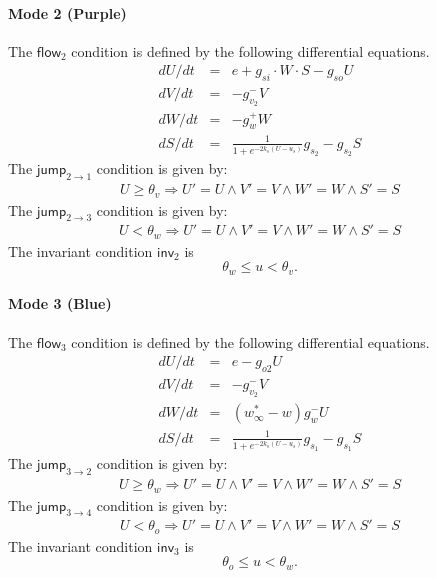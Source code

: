 \documentclass[envcountsect]{llncs}
\newcommand{\flow}{\mathsf{flow}}
\newcommand{\jump}{\mathsf{jump}}
\newcommand{\inv}{\mathsf{inv}}
\begin{document}
\paragraph{Mode 2 (Purple)}
The $\flow_2$ condition is defined by the following differential equations.
\begin{eqnarray*}
dU/dt &=& e  + g_{si}\cdot W\cdot S -g_{so}U\\
dV/dt &=& -g_{v_2}^- V\\
dW/dt &=& -g_w^+ W\\
dS/dt &=& \frac{1}{1+e^{-2k_s(U-u_s)}}g_{s_2} - g_{s_2}S
\end{eqnarray*}
The $\jump_{2\rightarrow 1}$ condition is given by:
\begin{eqnarray*}
U \geq \theta_v \Longrightarrow U' = U \wedge V' = V \wedge W' = W \wedge S'
= S
\end{eqnarray*}
The $\jump_{2\rightarrow 3}$ condition is given by:
\begin{eqnarray*}
U < \theta_w \Longrightarrow U' = U \wedge V' = V \wedge W' = W \wedge S'
= S
\end{eqnarray*}
The invariant condition $\inv_2$ is
$$\theta_w\leq u< \theta_v.$$

\paragraph{Mode 3 (Blue)}
The $\flow_3$ condition is defined by the following differential equations.
\begin{eqnarray*}
dU/dt &=& e  -g_{o2}U\\
dV/dt &=& -g_{v_2}^- V\\
dW/dt &=& (w^*_{\infty} - w) g_w^- U\\
dS/dt &=& \frac{1}{1+e^{-2k_s(U-u_s)}}g_{s_1} - g_{s_1}S
\end{eqnarray*}
The $\jump_{3\rightarrow 2}$ condition is given by:
\begin{eqnarray*}
U \geq \theta_w \Longrightarrow U' = U \wedge V' = V \wedge W' = W \wedge S'
= S
\end{eqnarray*}
The $\jump_{3\rightarrow 4}$ condition is given by:
\begin{eqnarray*}
U < \theta_o \Longrightarrow U' = U \wedge V' = V \wedge W' = W \wedge S'
= S
\end{eqnarray*}
The invariant condition $\inv_3$ is
$$\theta_o\leq u< \theta_w.$$
\end{document}
